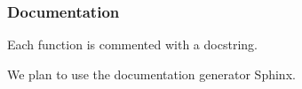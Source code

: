 \documentclass{beamer}
\begin{document}



	\begin{frame}
		\frametitle{Documentation}
		Each function is commented with a docstring.

		We plan to use the documentation generator Sphinx.
	\end{frame}


\end{document}
